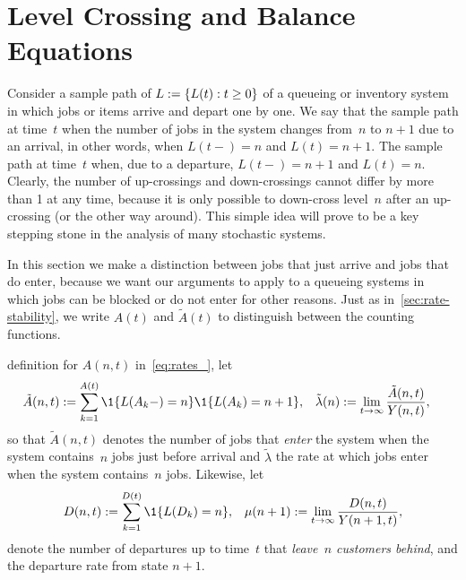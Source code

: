 \documentclass[stochastic-or.tex]{subfiles}
\begin{document}
\section{Level Crossing and Balance Equations}
\label{sec:level-cross-balance}

Consider a sample path of $L:=\{L(t) : t\geq 0\}$ of a queueing or inventory system in which jobs or items arrive and depart one by one.
We say that the sample path  at time~$t$ when the number of jobs in the system changes from~$n$ to $n+1$ due to an arrival, in other words, when $L(t-)=n$ and $L(t)=n+1$.
The sample path  at time~$t$ when, due to a departure, $L(t-)=n+1$ and $L(t)=n$.
Clearly, the number of up-crossings and down-crossings cannot differ by more than 1 at any time, because it is only possible to down-cross level~$n$ after an up-crossing (or the other way around).
This simple idea will prove to be a key stepping stone in the analysis of many stochastic systems.

In this section we make a distinction between jobs that just arrive and jobs that do enter, because we want our arguments to apply to a queueing systems in which jobs can be blocked or do not enter for other reasons.
Just as in~\cref{sec:rate-stability}, we write $A(t)$ and $\tilde A(t)$ to distinguish between the counting functions.


 definition for $A(n,t)$ in~\cref{eq:rates_}, let
\begin{align}\label{eq:102}
 \tilde A(n,t) &:=  \sum_{k=1}^{A(t)} \1{L(A_k-) = n}\1{\L(A_k) = n+1}, &
\tilde \lambda(n) &:= \lim_{t\to\infty} \frac{\tilde A(n,t)}{Y(n,t)},
 \end{align}
 so that $\tilde A(n,t)$ denotes the number of jobs that \emph{enter} the system when the system contains~$n$ jobs just before arrival and
$\tilde \lambda$  the rate at which jobs enter when the system contains~$n$ jobs.
Likewise, let
\begin{align}
 D(n,t) &:=  \sum_{k=1}^{D(t)} \1{\L(D_k) = n}, & \mu(n+1) := \lim_{t\to\infty} \frac{D(n,t)}{Y(n+1,t)},
 \end{align}
denote the number of departures up to time~$t$ that\emph{ leave~$n$ customers behind}, and the departure rate from state $n+1$.
\end{document}
